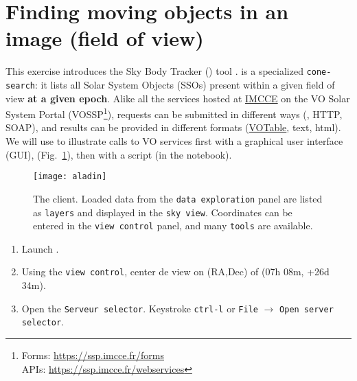 \section{Finding moving objects in an image (field of view)}
\setcounter{questions}{1}


  This exercise introduces the Sky Body Tracker (\skybot) tool
  \citep{2006-ASPC-351-Berthier}.
  \skybot is a specialized \texttt{cone-search}: it lists
  all Solar System Objects (SSOs) present within
  a given field of view \textbf{at a given epoch}.
  Alike all the services hosted at
  \href{https://www.imcce.fr}{IMCCE}
  on the VO Solar System Portal
  (VOSSP\footnote{Forms: \href{https://ssp.imcce.fr/forms}{https://ssp.imcce.fr/forms}\\
  \hspace*{1.8em}APIs: \href{https://ssp.imcce.fr/webservices}{https://ssp.imcce.fr/webservices}}),
  \skybot requests
  can be submitted in different ways
  (\aladin, HTTP, SOAP), and results can be provided in different 
  formats (\href{https://www.ivoa.net/documents/VOTable/}{VOTable}, text, html).\\

  We will use \skybot to illustrate calls to VO services first with
  a graphical user interface (GUI), \aladin (Fig.~\ref{fig:aladin}), then 
  with a \python script (in the  notebook).


\begin{figure}[ht]
  \centering
  \texttt{[image: aladin]}
  \caption{The \aladin client. Loaded data from the
  \texttt{data exploration} panel are listed as
  \texttt{layers} and displayed in the  
  \texttt{sky view}. Coordinates can be entered in the
  \texttt{view control} panel, and many
  \texttt{tools} are available.
  }
  \label{fig:aladin}
\end{figure}

\newpage
  \begin{enumerate}
    \setlength\itemsep{0em}
    \item Launch \aladin.

    \item Using the \texttt{view control}, center de view on (RA,Dec) of (07h 08m, +26d 34m).

    \item Open the \texttt{Serveur selector}. Keystroke \texttt{ctrl-l} or \texttt{File} 
      $\rightarrow$ \texttt{Open server selector}.
  \end{enumerate}
  \setcounter{saveitem}{\value{enumi}}  


